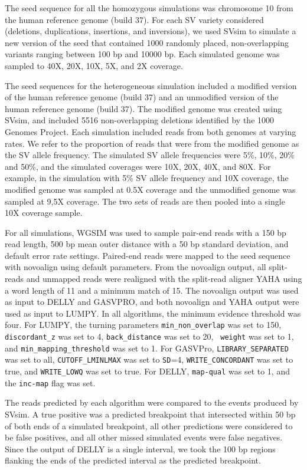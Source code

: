 \documentclass[10pt]{bmc_article}
\newenvironment{bmcformat}{\begin{raggedright}\baselineskip20pt\sloppy\setboolean{publ}{false}}{\end{raggedright}\baselineskip20pt\sloppy}
\begin{document}
\begin{bmcformat}
The seed sequence for all the homozygous simulations was chromosome 10 from the
human reference genome (build 37). For each SV variety considered (deletions,
duplications, insertions, and inversions), we used SVsim to simulate a new
version of the seed that contained 1000 randomly placed, non-overlapping
variants ranging between 100 bp and 10000 bp. Each simulated genome was sampled
to 40X, 20X, 10X, 5X, and 2X coverage.

The seed sequences for the heterogeneous simulation included a modified version
of the human reference genome (build 37) and an unmodified version of the human
reference genome (build 37).  The modified genome was created using SVsim, and
included 5516 non-overlapping deletions identified by the 1000 Genomes Project.
Each simulation included reads from both genomes at varying rates.  We refer to
the proportion of reads that were from the modified genome as the SV allele
frequency.  The simulated SV allele frequencies were 5\%, 10\%, 20\% and 50\%,
and the simulated coverages were 10X, 20X, 40X, and 80X.  For example, in the
simulation with 5\% SV allele frequency and 10X coverage, the modified genome
was sampled at 0.5X coverage and the unmodified genome was sampled at 9,5X
coverage.  The two sets of reads are then pooled into a single 10X coverage
sample.

For all simulations, WGSIM was used to sample pair-end reads with a 150 bp read
length, 500 bp mean outer distance with a 50 bp standard deviation, and default
error rate settings.  Paired-end reads were mapped to the seed sequence with
novoalign using default parameters. From the novoalign output, all split-reads
and unmapped reads were realigned with the split-read aligner YAHA using a word
length of 11 and a minimum match of 15. The novoalign output was used as input
to DELLY and GASVPRO, and both novoalign and YAHA output were used as input to
LUMPY. In all algorithms, the minimum evidence threshold was four. For LUMPY,
the turning parameters {\tt min\_non\_overlap} was set to 150, 
{\tt discordant\_z} was set to 4, {\tt back\_distance} was set to 20, {\tt
weight} was set to 1, and {\tt min\_mapping\_threshold} was set to 1.  For
GASVPro, {\tt LIBRARY\_SEPARATED} was set to all, {\tt CUTOFF\_LMINLMAX} was
set to {\tt SD}=4, {\tt WRITE\_CONCORDANT} was set to true, and 
{\tt WRITE\_LOWQ} was set to true.  For DELLY, {\tt map-qual} was set to 1, 
and the {\tt inc-map} flag was set.

The reads predicted by each algorithm were compared to the events produced by
SVsim. A true positive was a predicted breakpoint that intersected within 50 bp
of both ends of a simulated breakpoint, all other predictions were considered to
be false positives, and all other missed simulated events were false negatives.
Since the output of DELLY is a single interval, we took the 100 bp regions
flanking the ends of the predicted interval as the predicted breakpoint.


\end{bmcformat}
\end{document}
